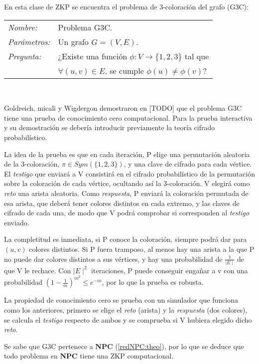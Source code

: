 En esta clase de ZKP se encuentra el problema de 3-coloración del grafo (G3C):


\hfil

\begin{tabular}{|ll}
	\textit{Nombre:} & Problema G3C. \\
	\textit{Parámetros:} &Un grafo $G=(V,E)$. \\
	\textit{Pregunta:} & ¿Existe una función $\phi : V \to \{1,2,3\}$ tal que \\ & $\forall (u,v)\in E$, se cumple $\phi(u)\neq \phi(v)$? \\
\end{tabular}
\\

\hfil

Goldreich, micali y Wigdergon demostraron en [TODO] que el problema G3C tiene una prueba de conocimiento cero computacional. Para la prueba interactiva y su demostración se debería introducir previamente la teoría cifrado probabilístico.

La idea de la prueba es que en cada iteración, P elige una permutación aleatoria de la 3-coloración, $\pi \in Sym(\{1,2,3\})$, y una clave de cifrado para cada vértice. El \textit{testigo} que enviará a V consistirá en el cifrado probabilístico de la permutación sobre la coloración de cada vértice, ocultando así la 3-coloración. V elegirá como \textit{reto} una arista aleatoria. Como \textit{respuesta}, P enviará la coloración permutada de esa arista, que deberá tener colores distintos en cada extremo, y las claves de cifrado de cada una, de modo que V podrá comprobar si corresponden al \textit{testigo} enviado.

La completitud es inmediata, si P conoce la coloración, siempre podrá dar para $(u,v)$ colores distintos. Si P fuera tramposo, al menos hay una arista a la que P no puede dar colores distintos a sus vértices, y hay una probabilidad de $\frac{1}{\mid E \mid}$ de que V le rechace. Con $\mid E \mid ^2$ iteraciones, P puede conseguir engañar a v con una probabilidad $(1-\frac{1}{m})^{m^2} \leq e^{-m}$, por lo que la prueba es robusta.

La propiedad de conocimiento cero se prueba con un simulador que funciona como los anteriores, primero se elige el \textit{reto} (arista) y la \textit{respuesta} (dos colores), se calcula el \textit{testigo} respecto de ambos y se comprueba si V hubiera elegido dicho \textit{reto}.

\hfil

Se sabe que G3C pertenece a \textbf{NPC} (\ref{redNPC:theo}), por lo que se deduce que todo problema en \textbf{NPC} tiene una ZKP computacional.
